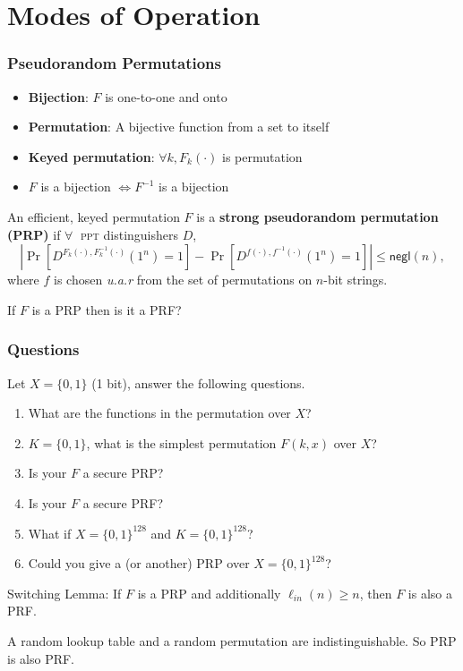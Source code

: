 \section{Modes of Operation}
\begin{frame}\frametitle{Pseudorandom Permutations}
\begin{itemize}
\item \textbf{Bijection}: $F$ is one-to-one and onto
\item \textbf{Permutation}: A bijective function from a set to itself
\item \textbf{Keyed permutation}: $\forall k, F_k(\cdot)$ is permutation
\item $F$ is a bijection $\iff F^{-1}$ is a bijection
\end{itemize}
\begin{definition}
An efficient, keyed permutation $F$ is a \textbf{strong pseudorandom permutation (PRP)} if
$\forall\;$ \textsc{ppt} distinguishers $D$,
\[ \left|\Pr[D^{F_k(\cdot),F_k^{-1}(\cdot)}(1^n)=1] - \Pr[D^{f(\cdot),f^{-1}(\cdot)}(1^n)=1]\right| \le \mathsf{negl}(n),
\]
where $f$ is chosen \emph{u.a.r} from the set of permutations on $n$-bit strings.
\end{definition}
\begin{alertblock}{If $F$ is a PRP then is it a PRF?}
\end{alertblock}
\end{frame}
\begin{frame}\frametitle{Questions}
\begin{exampleblock}{Let $X = \{ 0,1\}$ (1 bit), answer the following questions.}
\begin{enumerate}
\item What are the functions in the permutation over $X$?
\item $K = \{0, 1\}$, what is the simplest permutation $F(k, x)$ over $X$? 
\item Is your $F$ a secure PRP?
\item Is your $F$ a secure PRF?
\item What if $X = \{ 0,1\}^{128}$ and $K = \{0, 1\}^{128}$?
\item Could you give a (or another) PRP over $X = \{ 0,1\}^{128}$?
\end{enumerate}
\end{exampleblock}
\begin{proposition}{Switching Lemma:}
If $F$ is a PRP and additionally $\ell_{in} (n) \ge n$, then $F$ is also a PRF.
\end{proposition}
A random lookup table and a random permutation are indistinguishable. So PRP is also PRF.
\end{frame}
